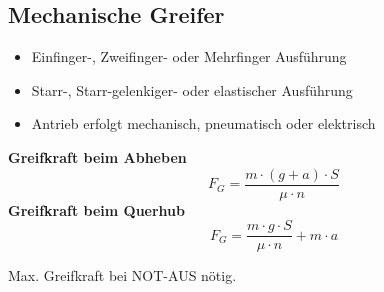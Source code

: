\begin{minipage}{0.5\linewidth}
    \vspace{-2cm}
    \subsection{Mechanische Greifer}
        \begin{itemize}
            \item Einfinger-, Zweifinger- oder Mehrfinger Ausführung
            \item Starr-, Starr-gelenkiger- oder elastischer Ausführung
            \item Antrieb erfolgt mechanisch, pneumatisch oder elektrisch
        \end{itemize}
    \begin{center}
     \textbf{Greifkraft beim Abheben}\hfill\null
    \[ \qquad F_G=\frac{m \cdot (g + a) \cdot S}{\mu \cdot n} \]
    \textbf{Greifkraft beim Querhub}\hfill\null
    \[ \qquad F_G=\frac{m \cdot g \cdot S}{\mu \cdot n} + m \cdot a \]
    \end{center}

        Max. Greifkraft bei NOT-AUS nötig.
        

\end{minipage}
